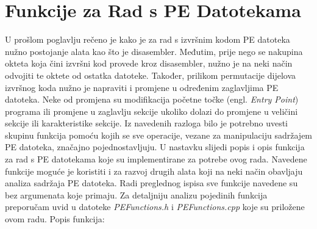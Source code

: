 \documentclass[times, utf8, diplomski, numeric]{fer}
\begin{document}
\section{Funkcije za Rad s PE Datotekama}
U prošlom poglavlju rečeno je kako je za rad s izvršnim kodom PE datoteka nužno postojanje alata kao što je disasembler. Međutim, prije nego se nakupina okteta koja čini izvršni kod provede kroz disasembler, nužno je na neki način odvojiti te oktete od ostatka datoteke. Također, prilikom permutacije dijelova izvršnog koda nužno je napraviti i promjene u određenim zaglavljima PE datoteka. Neke od promjena su modifikacija početne točke (engl. \emph{Entry Point}) programa ili promjene u zaglavlju sekcije ukoliko dolazi do promjene u veličini sekcije ili karakteristike sekcije. Iz navedenih razloga bilo je potrebno uvesti skupinu funkcija pomoću kojih se sve operacije, vezane za manipulaciju sadržajem PE datoteka, značajno pojednostavljuju. U nastavku slijedi popis i opis funkcija za rad s PE datotekama koje su implementirane za potrebe ovog rada. Navedene funkcije moguće je koristiti i za razvoj drugih alata koji na neki način obavljaju analiza sadržaja PE datoteka. Radi preglednog ispisa sve funkcije navedene su bez argumenata koje primaju. Za detaljniju analizu pojedinih funkcija preporučam uvid u datoteke \emph{PEFunctions.h} i \emph{PEFunctions.cpp} koje su priložene ovom radu. Popis funkcija:
\end{document}
